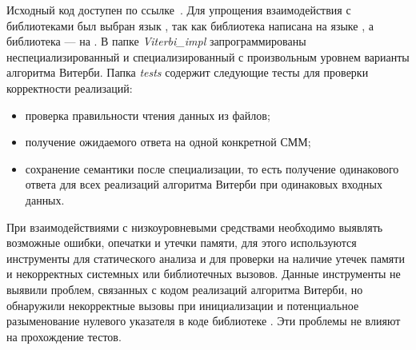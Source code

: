 Исходный код доступен по ссылке~\cite{repo}.
Для упрощения взаимодействия с библиотеками был выбран язык 
\CPP, так как библиотека  
написана на языке , а библиотека  --- на \CPP.
В папке \emph{Viterbi\_impl} запрограммированы
неспециализированный и специализированный с произвольным 
уровнем варианты алгоритма Витерби.
Папка \emph{tests} содержит следующие тесты для проверки 
корректности реализаций:
\begin{itemize}
	\item проверка правильности чтения данных из файлов;
	\item получение ожидаемого ответа на одной конкретной СММ;
	\item сохранение семантики после специализации, то есть 
	получение одинакового ответа для всех реализаций 
	алгоритма Витерби при одинаковых входных данных.
\end{itemize} 
При взаимодействиями с низкоуровневыми средствами
необходимо выявлять возможные ошибки, опечатки и утечки 
памяти, для этого используются инструменты  
для статического анализа и  для проверки на 
наличие утечек памяти и некорректных системных или 
библиотечных вызовов.
Данные инструменты не выявили проблем, связанных с кодом 
реализаций алгоритма Витерби, но обнаружили некорректные 
вызовы при инициализации  и потенциальное 
разыменование нулевого указателя в коде библиотеке .
Эти проблемы не влияют на прохождение тестов.